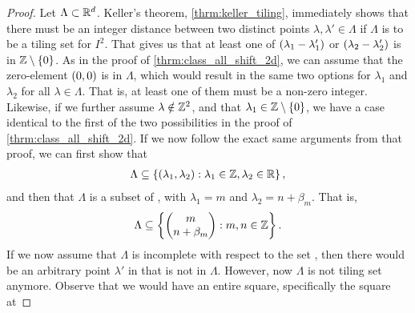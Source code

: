 \documentclass[../thesis.tex]{subfiles}
\begin{document}
\begin{proof}
    Let $\Lambda \subset \mathbb{R}^d$. Keller's theorem, \cref{thrm:keller_tiling}, immediately shows that there must be an integer distance between two distinct points $\lambda,\lambda' \in \Lambda$ if $\Lambda$ is to be a tiling set for $I^2$. That gives us that at least one of $(\lambda_1-\lambda_1')$ or $(\lambda_2-\lambda_2')$ is in $\mathbb{Z}\setminus\{0\}$. As in the proof of \cref{thrm:class_all_shift_2d}, we can assume that the zero-element $(0,0)$ is in $\Lambda$, which would result in the same two options for $\lambda_1$ and $\lambda_2$ for all $\lambda\in \Lambda$. That is, at least one of them must be a non-zero integer. Likewise, if we further assume $\lambda\notin \mathbb{Z}^2$, and that $\lambda_1 \in\mathbb{Z}\setminus\{0\}$, we have a case identical to the first of the two possibilities in the proof of \cref{thrm:class_all_shift_2d}. If we now follow the exact same arguments from that proof, we can first show that 
    \begin{align*}  %
        \Lambda \subseteq \braqMed{ \bracMed{\lambda_1, \lambda_2} : \lambda_1 \in \Z, \lambda_2 \in \R},
    \end{align*}
    and then that $\Lambda$ is a subset of , with $\lambda_1 = m$ and $\lambda_2 = n+\beta_m$. That is,
    \begin{equation*}  %
        \Lambda \subseteq \braqMed{\begin{pmatrix} m \\ n+\beta_m\end{pmatrix} : m,n \in \Z}.
    \end{equation*}
    If we now assume that $\Lambda$ is incomplete with respect to the set , then there would be an arbitrary point $\lambda'$ in  that is not in $\Lambda$. However, now $\Lambda$ is not tiling set anymore. Observe that we would have an entire square, specifically the square at

\end{proof}
\end{document}
